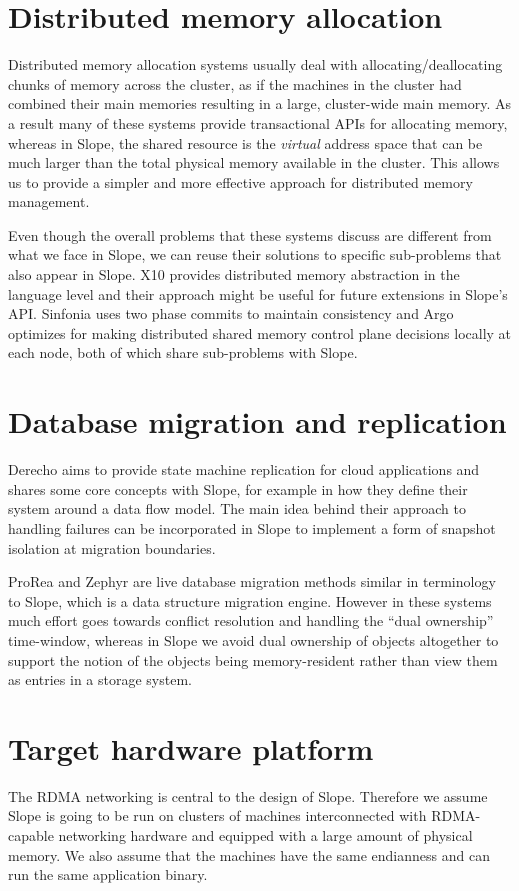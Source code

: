 \section{Distributed memory allocation}
Distributed memory allocation systems usually deal with
allocating/deallocating chunks of memory across the cluster, as if the machines
in the cluster had combined their main memories resulting in a large,
cluster-wide main memory. As a result
many of these systems provide transactional APIs for allocating memory,
whereas in
Slope, the shared resource is the \emph{virtual} address space that can be much
larger than the total physical memory available in the cluster. This allows us
to provide a simpler and more effective approach for distributed memory
management.

Even though the overall problems that these systems discuss are different from
what we face in Slope, we can reuse their solutions to specific sub-problems that
also appear in Slope. X10 \cite{charles2005x10} provides distributed memory
abstraction in the language level and their approach might be useful for
future extensions in Slope's API. Sinfonia \cite{aguilera2007sinfonia} uses
two phase commits to maintain consistency and Argo \cite{kaxiras2015turning}
optimizes for making distributed shared memory control plane decisions
locally at each node, both of which share sub-problems with Slope.

\section{Database migration and replication}
Derecho \cite{jha2019derecho} aims to provide state machine replication
for cloud applications and shares some core concepts with Slope, for
    example in how they define their system around a data flow model.
    The main idea behind their approach to handling failures can be
    incorporated in Slope to implement a form of snapshot isolation at
    migration boundaries.

ProRea \cite{ProRea2013} and Zephyr \cite{zephyr2011elmore} are live
database migration methods similar in terminology to Slope, which is a
data structure migration engine. However in these systems much effort goes
towards conflict resolution and handling the ``dual ownership''
time-window, whereas in Slope we avoid dual ownership of objects
altogether to support the notion of the objects being memory-resident
rather than view them as entries in a storage system.

\section{Target hardware platform}
The RDMA networking is central to the design of Slope. Therefore we assume Slope
is going to be run on clusters of machines interconnected with RDMA-capable
networking hardware and equipped with a large amount of physical memory. We
also assume that the machines have the same endianness and can run the same
application binary.

